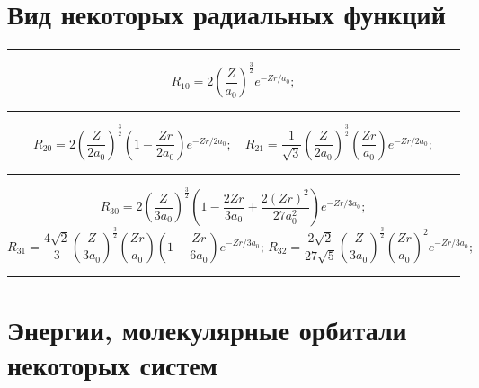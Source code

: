 \section{Вид некоторых радиальных функций}
\rule{\textwidth}{0.4pt}
\[ R_{10}=2 \left( \dfrac{Z}{a_0} \right)^{\frac{3}{2}}e^{-Zr/a_0}; \]
\rule{\textwidth}{0.4pt}
\[ R_{20}=2 \left( \dfrac{Z}{2a_0} \right)^{\frac{3}{2}}\left( 1-\dfrac{Zr}{2a_0} \right)e^{-Zr/2a_0}; \quad R_{21}=\dfrac{1}{\sqrt{3}} \left( \dfrac{Z}{2a_0} \right)^{\frac{3}{2}}\left( \dfrac{Zr}{a_0} \right)e^{-Zr/2a_0};\]
\rule{\textwidth}{0.4pt}
\[ R_{30}=2 \left( \dfrac{Z}{3a_0} \right)^{\frac{3}{2}}\left( 1-\dfrac{2Zr}{3a_0}+\dfrac{2(Zr)^2}{27a_0^2} \right)e^{-Zr/3a_0};\]
\[ R_{31}=\dfrac{4\sqrt{2}}{3} \left( \dfrac{Z}{3a_0} \right)^{\frac{3}{2}}\left( \dfrac{Zr}{a_0} \right)\left(1- \dfrac{Zr}{6a_0} \right)e^{-Zr/3a_0};\,R_{32}=\dfrac{2\sqrt2}{27\sqrt{5}} \left( \dfrac{Z}{3a_0} \right)^{\frac{3}{2}}\left( \dfrac{Zr}{a_0} \right)^2e^{-Zr/3a_0};\]
\rule{\textwidth}{0.4pt}


\section{\texorpdfstring{Энергии, молекулярные орбитали некоторых систем}{Энергии, молекулярные орбитали некоторых систем}}

\vspace{3mm}

